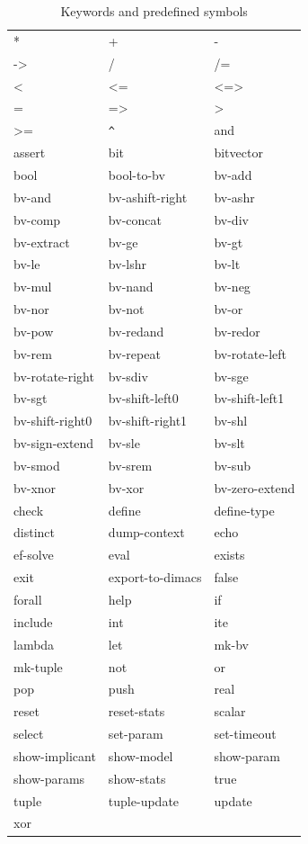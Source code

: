 \documentclass[11pt,twoside,fleqn,openright,titlepage]{cslreport}
\begin{document}
\begin{table}
\begin{small}
\begin{center}
\begin{tt}
\begin{tabular}{|p{3.4cm}|p{3.4cm}|p{3.4cm}|}
\hline
* & + & - \\
-> & / & /= \\
< & <= & <=> \\
 = & => & > \\
>= & \verb|^| & and \\
assert & bit & bitvector \\
bool & bool-to-bv & bv-add \\
bv-and & bv-ashift-right & bv-ashr\\
bv-comp & bv-concat & bv-div \\
bv-extract & bv-ge & bv-gt \\
bv-le & bv-lshr & bv-lt \\
bv-mul & bv-nand & bv-neg \\
bv-nor & bv-not & bv-or \\
bv-pow & bv-redand & bv-redor \\
bv-rem & bv-repeat & bv-rotate-left \\
bv-rotate-right & bv-sdiv & bv-sge \\
bv-sgt & bv-shift-left0 & bv-shift-left1 \\
bv-shift-right0 & bv-shift-right1 & bv-shl \\
bv-sign-extend & bv-sle & bv-slt \\
bv-smod & bv-srem & bv-sub \\
bv-xnor & bv-xor & bv-zero-extend \\
check & define & define-type \\
distinct & dump-context & echo  \\
ef-solve & eval & exists \\
exit & export-to-dimacs & false \\
forall & help & if \\
include & int & ite \\
lambda & let & mk-bv \\
mk-tuple & not & or \\
pop & push & real \\
reset & reset-stats & scalar \\
select & set-param & set-timeout \\
show-implicant & show-model & show-param \\
show-params & show-stats & true \\
tuple & tuple-update & update \\
xor &  &  \\
\hline
\end{tabular}
\end{tt}
\end{center}
\end{small}
\caption{Keywords and predefined symbols}
\label{syntax:keywords}
\end{table}
\end{document}
